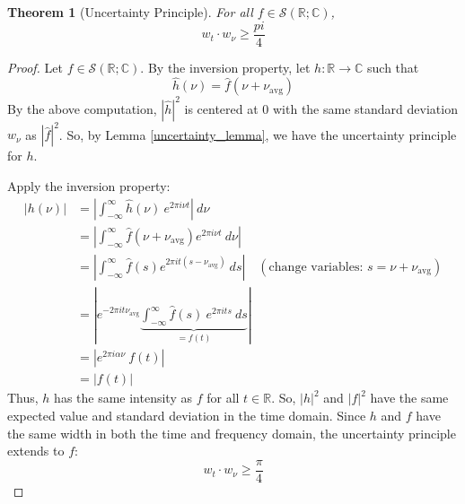 \documentclass[12pt, reqno]{amsart}
\newtheorem{theorem}{Theorem}[section]
\theoremstyle{definition}
\theoremstyle{remark}
\newcommand{\ud}{\mathrm{d}}
\begin{document}
\begin{itemize}
\begin{theorem}[Uncertainty Principle]

    For all $f\in\mathcal{S}(\mathbb{R;C})$, 
    \[
        w_t\cdot w_\nu\ge\frac{pi}{4}\]
    
\end{theorem}

\begin{proof}
    
    Let $f\in\mathcal{S}(\mathbb{R};\mathbb{C})$. By the inversion property, let $h:\mathbb{R}\rightarrow \mathbb{C}$ such that $$
    \widehat h(\nu)=\widehat f(\nu+\nu_\text{avg})
    $$
    By the above computation, $|\widehat h|^{2}$ is centered at 0 with the same standard deviation $w_\nu$ as $|\widehat f|^{2}$. So, by Lemma \ref{uncertainty_lemma}, we have the uncertainty principle for $h$.
    
    Apply the inversion property:
\begin{align*}
    |h(\nu)|&= \left|\int_{-\infty}^{\infty}\widehat h(\nu)~e^{2\pi i \nu t}\right|\ d \nu\\
    &=\left| \int_{-\infty}^{\infty}\widehat f(\nu+\nu_\text{avg})e^{2\pi i \nu t}\ d \nu\right|\\
    &=\left| \int_{-\infty}^{\infty}\widehat f(s)e^{2\pi i t (s-\nu_\text{avg})}\ ds\right|\quad(\text{change variables: }s=\nu+\nu_\text{avg})\\
    &=\left| e^{-2\pi i t\nu_\text{avg}}\underbrace{\int_{-\infty}^{\infty}\widehat f(s)~e^{2\pi i t s}\ ds}_{=f(t)}\right|\\
    &=\left| e^{2\pi i \alpha \nu}~ f(t)\right|\\
    &= \left|f(t)\right|
    \end{align*}
    Thus, $h$ has the same intensity as $f$ for all $t\in \mathbb{R}$. So, $|h|^{2}$ and $|f|^{2}$ have the same expected value and standard deviation in the time domain. Since $h$ and $f$ have the same width in both the time and frequency domain, the uncertainty principle extends to $f$: $$w_{t}\cdot w_{\nu}\ge \frac{\pi}{4}$$
\end{proof}




\end{itemize}
\end{document}
